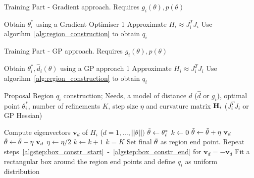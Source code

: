 \begin{minipage}{0.46\textwidth}
\begin{algorithm}[H]
    \centering
    \caption{Training Part - Gradient approach. Requires $g_i(\theta), p(\theta)$}\label{alg:training_GB}
    \begin{algorithmic}[1]
        \State Obtain $\theta_i^*$ using a Gradient Optimiser
         1
        \Else
        \State Approximate $H_i \approx J^T_iJ_i$
        \State Use algorihm~\ref{alg:region_construction} to obtain $q_i$
        \EndIf      
      \EndFor
    \end{algorithmic}
\end{algorithm}
\end{minipage}
\hfill
\begin{minipage}{0.46\textwidth}
\begin{algorithm}[H]
    \centering
    \caption{Training Part - GP approach. Requires $g_i(\theta), p(\theta)$}\label{alg:training_GP}
    \begin{algorithmic}[1]
        \State Obtain $\theta_i^*, \hat{d}_i(\theta)$ using a GP approach
         1
        \Else
        \State Approximate $H_i \approx J^T_iJ_i$
        \State Use algorihm~\ref{alg:region_construction} to obtain $q_i$
        \EndIf      
      \EndFor
    \end{algorithmic}
\end{algorithm}
\end{minipage}

\begin{algorithm}[!ht]
	\caption{Proposal Region $q_i$ construction; Needs, a model of distance $d$ ($\hat{d}$ or $g_i$), optimal point $\theta_i^*$, number of refinements $K$, step size $\eta$ and curvature matrix $\mathbf{H}_i$ ($J_i^TJ_i $ or GP Hessian)}\label{alg:region_construction}
	\begin{algorithmic}[1]
	\State Compute eigenvectors $\mathbf{v}_{d}$ of $H_i$ {\scriptsize ($d = 1,\ldots,||\theta ||)$}
		\State $\Tilde{\theta} \gets \theta_i^*$ \label{algstep:box_constr_start}
		\State $k \gets 0$
		\Repeat
        	\Repeat
                \State $\Tilde{\theta} \gets \Tilde{\theta} + \eta \ \mathbf{v}_{d}$ 
        	\State $\Tilde{\theta} \gets \Tilde{\theta} - \eta \ \mathbf{v}_{d}$
        	\State $\eta \gets \eta/2$ 
        	\State $k \gets k + 1$
    	\Until $k = K$
    	\State Set final $\Tilde{\theta}$ as region end point. \label{algstep:box_constr_end}
    	\State Repeat steps~\ref{algstep:box_constr_start}~-~\ref{algstep:box_constr_end} for $\mathbf{v}_{d} = - \mathbf{v}_{d}$
	\EndFor
	\State Fit a rectangular box around the region end points and define $q_i$ as uniform distribution
	\end{algorithmic}
\end{algorithm}

